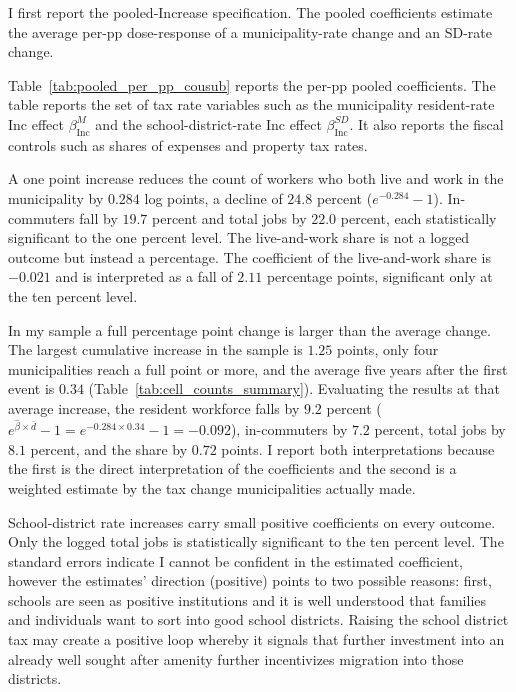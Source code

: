\documentclass[12pt]{article}
\begin{document}
I first report the pooled-Increase specification. The pooled coefficients estimate the average per-pp dose-response of a
municipality-rate change and an SD-rate change.

Table~\ref{tab:pooled_per_pp_cousub} reports the per-pp pooled
coefficients. The table reports the set of tax rate variables such as the municipality resident-rate
Inc effect $\beta^M_{\text{Inc}}$ and the school-district-rate Inc
effect $\beta^{SD}_{\text{Inc}}$. It also reports the fiscal controls such as shares of expenses and property tax rates.



A one point increase reduces the count of workers who both
live and work in the municipality by $0.284$ log points, a decline of
$24.8$ percent ($e^{-0.284}-1$). In-commuters fall by $19.7$ percent and
total jobs by $22.0$ percent, each statistically significant to the one percent level. The live-and-work
share is not a logged outcome but instead a percentage. The coefficient of the live-and-work
share is
$-0.021$ and is interpreted as a fall of $2.11$ percentage points, significant only
at the ten percent level.

In my sample a full percentage point change is larger than the average change. The
largest cumulative increase in the sample is $1.25$ points, only four
municipalities reach a full point or more, and the average five years
after the first event is $0.34$
(Table~\ref{tab:cell_counts_summary}). Evaluating the results at that
average increase, the resident workforce falls by $9.2$ percent
($e^{\hat\beta \times \bar d} - 1 = e^{-0.284 \times 0.34} - 1 = -0.092$),
in-commuters by $7.2$ percent, total jobs by $8.1$ percent, and the share
by $0.72$ points. I report both interpretations because the first is the direct interpretation of the
coefficients and the second is a weighted estimate by the tax change municipalities actually
made.

School-district rate increases carry small positive coefficients on every
outcome. Only the logged total jobs is statistically significant to the ten percent level. The standard errors indicate I cannot be confident in the estimated coefficient, however the estimates' direction (positive) points to two possible reasons: first, schools are seen as positive institutions and it is well understood that families and individuals want to sort into good school districts. Raising the school district tax may create a positive loop whereby it signals that further investment into an already well sought after amenity further incentivizes migration into those districts.
\end{document}

